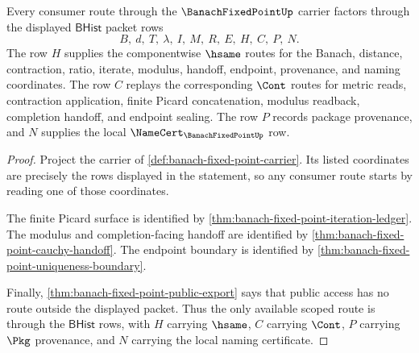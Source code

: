 \begin{theorem}
\label{thm:banach-fixed-point-scoped-transport-route}
Every consumer route through the $\BanachFixedPointUp$ carrier factors through the displayed $\mathsf{BHist}$ packet rows
$$
B,\ d,\ T,\ \lambda,\ I,\ M,\ R,\ E,\ H,\ C,\ P,\ N.
$$
The row $H$ supplies the componentwise $\hsame$ routes for the Banach, distance, contraction, ratio, iterate, modulus, handoff, endpoint, provenance, and naming coordinates. The row $C$ replays the corresponding $\Cont$ routes for metric reads, contraction application, finite Picard concatenation, modulus readback, completion handoff, and endpoint sealing. The row $P$ records package provenance, and $N$ supplies the local $\NameCert_{\BanachFixedPointUp}$ row.
\end{theorem}
\begin{proof}
Project the carrier of \autoref{def:banach-fixed-point-carrier}. Its listed coordinates are precisely the rows displayed in the statement, so any consumer route starts by reading one of those coordinates.

The finite Picard surface is identified by \autoref{thm:banach-fixed-point-iteration-ledger}. The modulus and completion-facing handoff are identified by \autoref{thm:banach-fixed-point-cauchy-handoff}. The endpoint boundary is identified by \autoref{thm:banach-fixed-point-uniqueness-boundary}.

Finally, \autoref{thm:banach-fixed-point-public-export} says that public access has no route outside the displayed packet. Thus the only available scoped route is through the $\mathsf{BHist}$ rows, with $H$ carrying $\hsame$, $C$ carrying $\Cont$, $P$ carrying $\Pkg$ provenance, and $N$ carrying the local naming certificate.
\end{proof}

